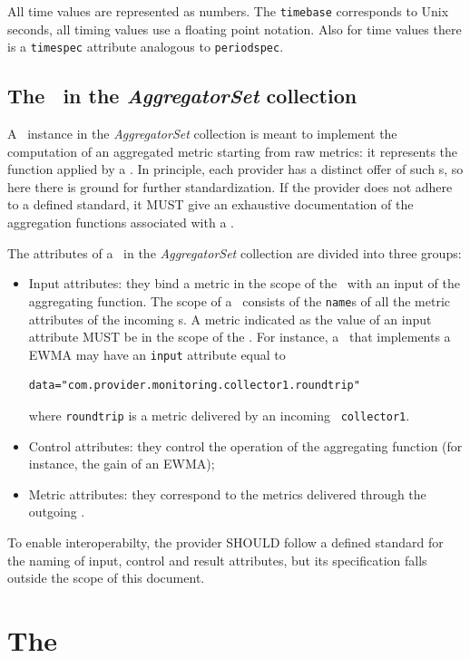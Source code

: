 \documentclass[12pt]{article}  %
\begin{document}
{All time values are represented as numbers. The {\tt timebase} corresponds to Unix seconds, all timing values use a floating point notation. Also for time values there is a {\tt timespec} attribute analogous to {\tt periodspec}.

\subsection{The \mi\ in the {\em AggregatorSet} collection}

A \mi\ instance in the {\em AggregatorSet} collection is meant to implement the computation of an aggregated metric starting from raw metrics: it represents the function applied by a \sens. In principle, each provider has a distinct offer of such \mi s, so here there is ground for further standardization. If the provider does not adhere to a defined standard, it MUST give an exhaustive documentation of the aggregation functions associated with a \mi.

The attributes of a \mi\ in the {\em AggregatorSet} collection are divided into three groups:

\begin{itemize}
\item Input attributes: they bind a metric in the scope of the \sens\ with an input of the aggregating function. The scope of a \sens\ consists of the {\tt name}s of all the metric attributes of the incoming \coll s. A metric indicated as the value of an input attribute MUST be in the scope of the \sens . For instance, a \sens\ that implements a EWMA may have an {\tt input} attribute equal to 
\begin{verbatim}
data="com.provider.monitoring.collector1.roundtrip"
\end{verbatim}
where \verb&roundtrip& is a metric delivered by an incoming \coll\ {\tt collector1}.
\item Control attributes: they control the operation of the aggregating function (for instance, the gain of an EWMA);
\item Metric attributes: they correspond to the metrics delivered through the outgoing \coll.
\end{itemize}

To enable interoperabilty, the provider SHOULD follow a defined standard for the naming of input, control and result attributes, but its specification falls outside the scope of this document.

\section{The \coll}

}
\end{document}
